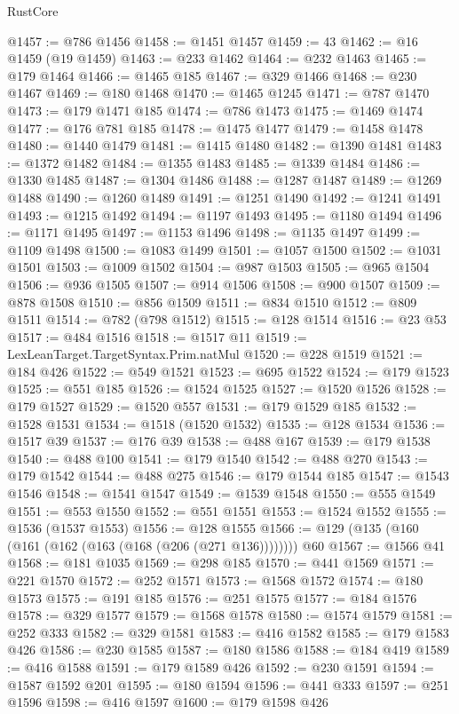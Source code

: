 \begin{lexlean}{RustCore}
\begin{coremodule}
@1457 := @786 @1456
@1458 := @1451 @1457
@1459 := 43
@1462 := @16 @1459 (@19 @1459)
@1463 := @233 @1462
@1464 := @232 @1463
@1465 := @179 @1464
@1466 := @1465 @185
@1467 := @329 @1466
@1468 := @230 @1467
@1469 := @180 @1468
@1470 := @1465 @1245
@1471 := @787 @1470
@1473 := @179 @1471 @185
@1474 := @786 @1473
@1475 := @1469 @1474
@1477 := @176 @781 @185
@1478 := @1475 @1477
@1479 := @1458 @1478
@1480 := @1440 @1479
@1481 := @1415 @1480
@1482 := @1390 @1481
@1483 := @1372 @1482
@1484 := @1355 @1483
@1485 := @1339 @1484
@1486 := @1330 @1485
@1487 := @1304 @1486
@1488 := @1287 @1487
@1489 := @1269 @1488
@1490 := @1260 @1489
@1491 := @1251 @1490
@1492 := @1241 @1491
@1493 := @1215 @1492
@1494 := @1197 @1493
@1495 := @1180 @1494
@1496 := @1171 @1495
@1497 := @1153 @1496
@1498 := @1135 @1497
@1499 := @1109 @1498
@1500 := @1083 @1499
@1501 := @1057 @1500
@1502 := @1031 @1501
@1503 := @1009 @1502
@1504 := @987 @1503
@1505 := @965 @1504
@1506 := @936 @1505
@1507 := @914 @1506
@1508 := @900 @1507
@1509 := @878 @1508
@1510 := @856 @1509
@1511 := @834 @1510
@1512 := @809 @1511
@1514 := @782 (@798 @1512)
@1515 := @128 @1514
@1516 := @23 @53
@1517 := @484 @1516
@1518 := @1517 @11
@1519 := LexLeanTarget.TargetSyntax.Prim.natMul
@1520 := @228 @1519
@1521 := @184 @426
@1522 := @549 @1521
@1523 := @695 @1522
@1524 := @179 @1523
@1525 := @551 @185
@1526 := @1524 @1525
@1527 := @1520 @1526
@1528 := @179 @1527
@1529 := @1520 @557
@1531 := @179 @1529 @185
@1532 := @1528 @1531
@1534 := @1518 (@1520 @1532)
@1535 := @128 @1534
@1536 := @1517 @39
@1537 := @176 @39
@1538 := @488 @167
@1539 := @179 @1538
@1540 := @488 @100
@1541 := @179 @1540
@1542 := @488 @270
@1543 := @179 @1542
@1544 := @488 @275
@1546 := @179 @1544 @185
@1547 := @1543 @1546
@1548 := @1541 @1547
@1549 := @1539 @1548
@1550 := @555 @1549
@1551 := @553 @1550
@1552 := @551 @1551
@1553 := @1524 @1552
@1555 := @1536 (@1537 @1553)
@1556 := @128 @1555
@1566 := @129 (@135 (@160 (@161 (@162 (@163 (@168 (@206 (@271 @136)))))))) @60
@1567 := @1566 @41
@1568 := @181 @1035
@1569 := @298 @185
@1570 := @441 @1569
@1571 := @221 @1570
@1572 := @252 @1571
@1573 := @1568 @1572
@1574 := @180 @1573
@1575 := @191 @185
@1576 := @251 @1575
@1577 := @184 @1576
@1578 := @329 @1577
@1579 := @1568 @1578
@1580 := @1574 @1579
@1581 := @252 @333
@1582 := @329 @1581
@1583 := @416 @1582
@1585 := @179 @1583 @426
@1586 := @230 @1585
@1587 := @180 @1586
@1588 := @184 @419
@1589 := @416 @1588
@1591 := @179 @1589 @426
@1592 := @230 @1591
@1594 := @1587 @1592 @201
@1595 := @180 @1594
@1596 := @441 @333
@1597 := @251 @1596
@1598 := @416 @1597
@1600 := @179 @1598 @426

\end{coremodule}
\end{lexlean}
